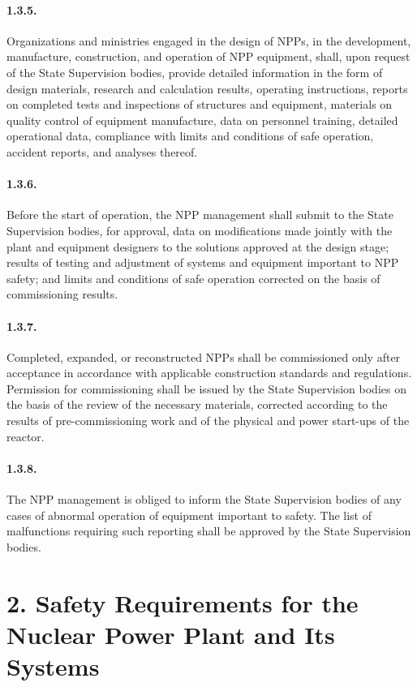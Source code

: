 \documentclass[openright]{bookest}
\begin{document}
\paragraph{1.3.5.}
Organizations and ministries engaged in the design of NPPs, in the development, manufacture, construction, and operation of NPP equipment, shall, upon request of the State Supervision bodies, provide detailed information in the form of design materials, research and calculation results, operating instructions, reports on completed tests and inspections of structures and equipment, materials on quality control of equipment manufacture, data on personnel training, detailed operational data, compliance with limits and conditions of safe operation, accident reports, and analyses thereof.

\paragraph{1.3.6.}
Before the start of operation, the NPP management shall submit to the State Supervision bodies, for approval, data on modifications made jointly with the plant and equipment designers to the solutions approved at the design stage; results of testing and adjustment of systems and equipment important to NPP safety; and limits and conditions of safe operation corrected on the basis of commissioning results.

\paragraph{1.3.7.}
Completed, expanded, or reconstructed NPPs shall be commissioned only after acceptance in accordance with applicable construction standards and regulations. Permission for commissioning shall be issued by the State Supervision bodies on the basis of the review of the necessary materials, corrected according to the results of pre-commissioning work and of the physical and power start-ups of the reactor.

\paragraph{1.3.8.}
The NPP management is obliged to inform the State Supervision bodies of any cases of abnormal operation of equipment important to safety. The list of malfunctions requiring such reporting shall be approved by the State Supervision bodies.

\section*{2. Safety Requirements for the Nuclear Power Plant and Its Systems}
\end{document}
